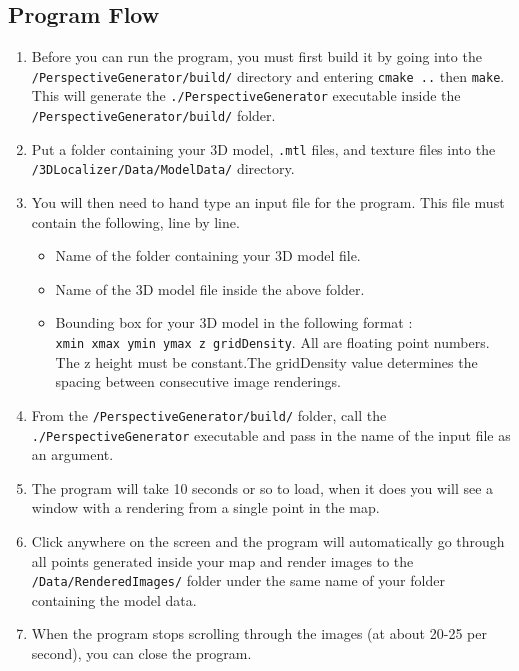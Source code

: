 \documentclass[a4paper,11pt]{article}
\begin{document}
        \subsection{Program Flow}
	\begin{enumerate}
	 \item Before you can run the program, you must first build it by going into the \texttt{/PerspectiveGenerator/build/} directory and entering
	 \texttt{cmake ..} then \texttt{make}.
	 This will generate the \texttt{./PerspectiveGenerator} executable inside the \texttt{/PerspectiveGenerator/build/} folder. 
	 \item Put a folder containing your 3D model, \texttt{.mtl} files, and texture files into the \texttt{/3DLocalizer/Data/ModelData/} directory. 
	 \item You will then need to hand type an input file for the program. This file must contain the following, line by line.
	  \begin{itemize}
	  \item Name of the folder containing your 3D model file.
	  \item Name of the 3D model file inside the above folder.
	  \item Bounding box for your 3D model in the following format : \\ \texttt{xmin xmax ymin ymax z gridDensity}. All are floating point numbers. 
	  The z height must be constant.The gridDensity value determines the spacing between consecutive image renderings.
	  \end{itemize}
	\item From the \texttt{/PerspectiveGenerator/build/} folder, call the \texttt{./PerspectiveGenerator} executable and pass in the name of the input file as an argument.
	\item The program will take 10 seconds or so to load, when it does you will see a window with a rendering from a single point in the map. 
	\item Click anywhere on the screen and the program will automatically go through all points generated inside your map and render images to the
	  \texttt{/Data/RenderedImages/} folder
	under the same name of your folder containing the model data.
	\item When the program stops scrolling through the images (at about 20-25 per second), you can close the program.
	\end{enumerate}
\end{document}
